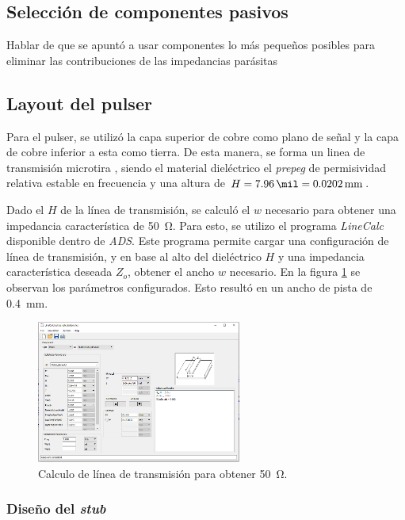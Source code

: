 \subsection{Selección de componentes pasivos}

Hablar de que se apuntó a usar componentes lo más pequeños posibles para
eliminar las contribuciones de las impedancias parásitas

\subsection{Layout del pulser}

Para el pulser, se utilizó la capa superior de cobre como plano de señal y la
capa de cobre inferior a esta como tierra. De esta manera, se forma un linea de
transmisión microtira \cite{pozar2011}, siendo el material dieléctrico el
\textit{prepeg} de permisividad relativa estable en frecuencia y una altura de
$H = \qty{7.96}{\mil} = \qty{0.0202}{\milli\meter}$.

Dado el $H$ de la línea de transmisión, se calculó el $w$ necesario para obtener
una impedancia característica de \qty{50}{\ohm}. Para esto, se utilizo el
programa \textit{LineCalc} disponible dentro de \textit{ADS}. Este programa
permite cargar una configuración de línea de transmisión, y en base al alto del
dieléctrico $H$ y una impedancia característica deseada $Z_o$, obtener el ancho
$w$ necesario. En la figura \ref{fig:tline_width_calculation} se observan los
parámetros configurados. Esto resultó en un ancho de pista de
\qty{0.4}{\milli\meter}.

\begin{figure}[tbp]
    \centering
    \includegraphics[width=0.6\textwidth]{images/tline_width_calculation.png}
    \caption{Calculo de línea de transmisión para obtener \qty{50}{\ohm}.}
    \label{fig:tline_width_calculation}
\end{figure}

\subsubsection{Diseño del \textit{stub}}

